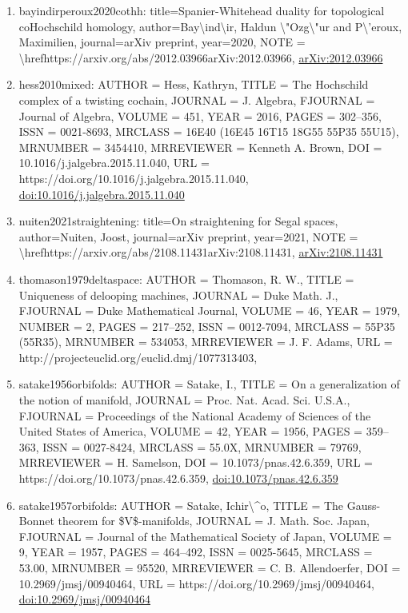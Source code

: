 \documentclass[11pt]{article}
\begin{document}
\begin{enumerate}[leftmargin=*]
  \item bayindirperoux2020cothh: title=Spanier-Whitehead duality for topological coHochschild homology, author=Bay\textbackslash{}ind\textbackslash{}ir, Haldun \textbackslash{}"Ozg\textbackslash{}"ur and P\textbackslash{}'eroux, Maximilien, journal=arXiv preprint, year=2020, NOTE = \textbackslash{}hrefhttps://arxiv.org/abs/2012.03966arXiv:2012.03966, \href{https://arxiv.org/abs/2012.03966}{arXiv:2012.03966}
  \item hess2010mixed: AUTHOR = Hess, Kathryn, TITLE = The Hochschild complex of a twisting cochain, JOURNAL = J. Algebra, FJOURNAL = Journal of Algebra, VOLUME = 451, YEAR = 2016, PAGES = 302--356, ISSN = 0021-8693, MRCLASS = 16E40 (16E45 16T15 18G55 55P35 55U15), MRNUMBER = 3454410, MRREVIEWER = Kenneth A. Brown, DOI = 10.1016/j.jalgebra.2015.11.040, URL = https://doi.org/10.1016/j.jalgebra.2015.11.040, \href{https://doi.org/10.1016/j.jalgebra.2015.11.040}{doi:10.1016/j.jalgebra.2015.11.040}
  \item nuiten2021straightening: title=On straightening for Segal spaces, author=Nuiten, Joost, journal=arXiv preprint, year=2021, NOTE = \textbackslash{}hrefhttps://arxiv.org/abs/2108.11431arXiv:2108.11431, \href{https://arxiv.org/abs/2108.11431}{arXiv:2108.11431}
  \item thomason1979deltaspace: AUTHOR = Thomason, R. W., TITLE = Uniqueness of delooping machines, JOURNAL = Duke Math. J., FJOURNAL = Duke Mathematical Journal, VOLUME = 46, YEAR = 1979, NUMBER = 2, PAGES = 217--252, ISSN = 0012-7094, MRCLASS = 55P35 (55R35), MRNUMBER = 534053, MRREVIEWER = J. F. Adams, URL = http://projecteuclid.org/euclid.dmj/1077313403,
  \item satake1956orbifolds: AUTHOR = Satake, I., TITLE = On a generalization of the notion of manifold, JOURNAL = Proc. Nat. Acad. Sci. U.S.A., FJOURNAL = Proceedings of the National Academy of Sciences of the United States of America, VOLUME = 42, YEAR = 1956, PAGES = 359--363, ISSN = 0027-8424, MRCLASS = 55.0X, MRNUMBER = 79769, MRREVIEWER = H. Samelson, DOI = 10.1073/pnas.42.6.359, URL = https://doi.org/10.1073/pnas.42.6.359, \href{https://doi.org/10.1073/pnas.42.6.359}{doi:10.1073/pnas.42.6.359}
  \item satake1957orbifolds: AUTHOR = Satake, Ichir\textbackslash{}\^{}o, TITLE = The Gauss-Bonnet theorem for \$V\$-manifolds, JOURNAL = J. Math. Soc. Japan, FJOURNAL = Journal of the Mathematical Society of Japan, VOLUME = 9, YEAR = 1957, PAGES = 464--492, ISSN = 0025-5645, MRCLASS = 53.00, MRNUMBER = 95520, MRREVIEWER = C. B. Allendoerfer, DOI = 10.2969/jmsj/00940464, URL = https://doi.org/10.2969/jmsj/00940464, \href{https://doi.org/10.2969/jmsj/00940464}{doi:10.2969/jmsj/00940464}

\end{enumerate}
\end{document}
